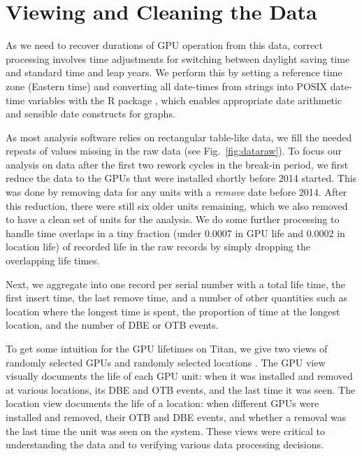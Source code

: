 \section{Viewing and Cleaning the Data}
\label{section:dataclean}
As we need to recover durations of GPU operation from this data, correct
processing involves time adjustments for switching between daylight
saving time and standard time and leap years. We perform this by
setting a reference time zone (Eastern time) and converting all
date-times from strings into POSIX date-time variables with the R
 package \cite{lubridate}, which enables appropriate
date arithmetic and sensible date constructs for graphs.

As most analysis software relies on rectangular table-like data, we
fill the needed repeats of values missing in the raw data (see
Fig.~\ref{fig:dataraw}). To focus our analysis on data after the first
two rework cycles in the break-in period, we first reduce the data to
the GPUs that were installed shortly before 2014 started. This was
done by removing data for any units with a {\em remove} date before
2014. After this reduction, there were still six older units
remaining, which we also removed to have a clean set of units for the
analysis. We do some further processing to handle time overlaps in a
tiny fraction (under 0.0007 in GPU life and 0.0002 in location life)
of recorded life in the raw records by simply dropping the overlapping
life times. 

Next, we aggregate into one record per serial number with a total life
time, the first insert time, the last remove time, and a number of
other quantities such as location where the longest time is spent, the
proportion of time at the longest location, and the number of DBE or
OTB events.

To get some intuition for the GPU lifetimes on Titan, we give two
views of  randomly selected GPUs and  randomly
selected locations .  The GPU view
visually documents the life of each GPU unit: when it was installed
and removed at various locations, its DBE and OTB events, and the last
time it was seen. The location view documents the life of a location:
when different GPUs were installed and removed, their OTB and DBE
events, and whether a removal was the last time the unit was seen on
the system. These views were critical to understanding the data and to
verifying various data processing decisions.

